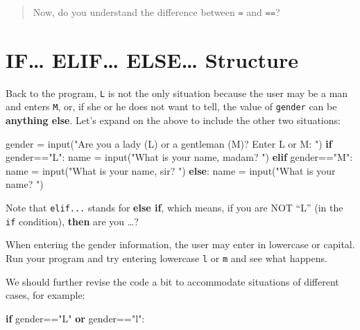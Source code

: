 \documentclass[
  letterpaper,
]{scrbook}
\newenvironment{Shaded}{\begin{snugshade}}{\end{snugshade}}
\newcommand{\BuiltInTok}[1]{\textcolor[rgb]{0.00,0.23,0.31}{#1}}
\newcommand{\ControlFlowTok}[1]{\textcolor[rgb]{0.00,0.23,0.31}{\textbf{#1}}}
\newcommand{\KeywordTok}[1]{\textcolor[rgb]{0.00,0.23,0.31}{\textbf{#1}}}
\newcommand{\NormalTok}[1]{\textcolor[rgb]{0.00,0.23,0.31}{#1}}
\newcommand{\OperatorTok}[1]{\textcolor[rgb]{0.37,0.37,0.37}{#1}}
\newcommand{\StringTok}[1]{\textcolor[rgb]{0.13,0.47,0.30}{#1}}
\begin{document}
\begin{quote}
Now, do you understand the difference between \texttt{=} and
\texttt{==}?
\end{quote}

\section*{IF\ldots{} ELIF\ldots{} ELSE\ldots{}
Structure}\label{if-elif-else-structure}


Back to the program, \texttt{L} is not the only situation because the
user may be a man and enters \texttt{M}, or, if she or he does not want
to tell, the value of \texttt{gender} can be \textbf{anything else}.
Let's expand on the above to include the other two situations:

\begin{Shaded}
\begin{Highlighting}[]
\NormalTok{gender }\OperatorTok{=} \BuiltInTok{input}\NormalTok{(}\StringTok{"Are you a lady (L) or a gentleman (M)? Enter L or M: "}\NormalTok{)}
\ControlFlowTok{if}\NormalTok{ gender}\OperatorTok{==}\StringTok{"L"}\NormalTok{:}
\NormalTok{  name }\OperatorTok{=} \BuiltInTok{input}\NormalTok{(}\StringTok{"What is your name, madam? "}\NormalTok{)}
\ControlFlowTok{elif}\NormalTok{ gender}\OperatorTok{==}\StringTok{"M"}\NormalTok{:}
\NormalTok{  name }\OperatorTok{=} \BuiltInTok{input}\NormalTok{(}\StringTok{"What is your name, sir? "}\NormalTok{)}
\ControlFlowTok{else}\NormalTok{:}
\NormalTok{  name }\OperatorTok{=} \BuiltInTok{input}\NormalTok{(}\StringTok{"What is your name? "}\NormalTok{)}
\end{Highlighting}
\end{Shaded}

Note that \texttt{elif...} stands for \textbf{else if}, which means, if
you are NOT ``L'' (in the \texttt{if} condition), \textbf{then} are you
\ldots?

When entering the gender information, the user may enter in lowercase or
capital. Run your program and try entering lowercase \texttt{l} or
\texttt{m} and see what happens.

We should further revise the code a bit to accommodate situations of
different cases, for example:

\begin{Shaded}
\begin{Highlighting}[]
\ControlFlowTok{if}\NormalTok{ gender}\OperatorTok{==}\StringTok{"L"} \KeywordTok{or}\NormalTok{ gender}\OperatorTok{==}\StringTok{"l"}\NormalTok{:}
\end{Highlighting}
\end{Shaded}
\end{document}
